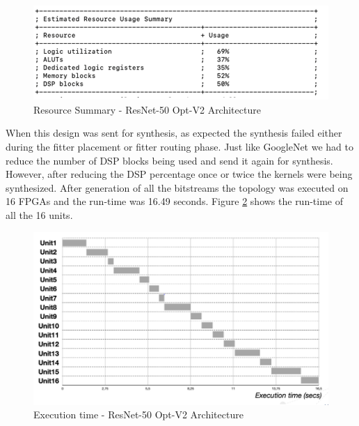 \begin{figure}[!htb]
  \includegraphics[width=\textwidth,height=\textheight,keepaspectratio]{img/ResNet_DSP_usage.png}
  \caption{Resource Summary - ResNet-50 Opt-V2 Architecture}
  \label{fig:ResNet50_Optv2_usage}
\end{figure}
\newline
When this design was sent for synthesis, as expected the synthesis failed either during the fitter placement or fitter routing phase. Just like GoogleNet we had to reduce the number of DSP blocks being used and send it again for synthesis. However, after reducing the DSP percentage once or twice the kernels were being synthesized. After generation of all the bitstreams the topology was executed on 16 FPGAs and the run-time was 16.49 seconds. Figure \ref{fig:ResNet50_Optv2} shows the run-time of all the 16 units.

\begin{figure}[!htb]
  \includegraphics[width=\textwidth,height=\textheight,keepaspectratio]{img/ResNet_DSP.png}
  \caption{Execution time - ResNet-50 Opt-V2 Architecture}
  \label{fig:ResNet50_Optv2}
\end{figure}

